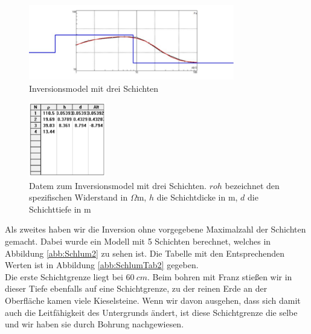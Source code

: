 \begin{figure}[h]
\centering
\includegraphics[width=0.8\textwidth]{fig/Schlumberger_3Schichten.pdf}
\caption{Inversionsmodel mit drei Schichten }
\label{abb:Schlum1}
\end{figure}
\begin{figure}[h]
\centering
\includegraphics[width=0.3\textwidth]{fig/schlumbergerTabelle.pdf}
\caption{Datem zum Inversionsmodel mit drei Schichten. $roh$ bezeichnet den spezifischen Widerstand in $\Omega$m, $h$ die Schichtdicke in m, $d$ die Schichttiefe in m}
\label{abb:SchlumTab1}
\end{figure}


Als zweites haben wir die Inversion ohne vorgegebene Maximalzahl der Schichten gemacht. Dabei wurde ein Modell mit 5 Schichten berechnet, welches in Abbildung \ref{abb:Schlum2} zu sehen ist. Die Tabelle mit den Entsprechenden Werten ist in Abbildung \ref{abb:SchlumTab2} gegeben. \\
Die erste Schichtgrenze liegt bei $\SI{60}{cm}$. Beim bohren mit Franz stießen wir in dieser Tiefe ebenfalls auf eine Schichtgrenze, zu der reinen Erde an der Oberfläche kamen viele Kieselsteine. Wenn wir davon ausgehen, dass sich damit auch die Leitfähigkeit des Untergrunds ändert, ist diese Schichtgrenze die selbe und wir haben sie durch Bohrung nachgewiesen.\\
  
